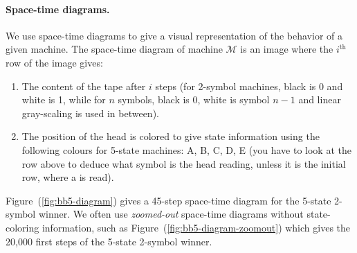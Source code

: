 


\paragraph*{Space-time diagrams.} We use space-time diagrams to give a visual representation of the behavior of a given machine. The space-time diagram of machine $\mathcal{M}$ is an image where the $i^\text{th}$ row of the image gives:
\begin{enumerate}
    \item The content of the tape after $i$ steps (for 2-symbol machines, black is 0 and white is 1, while for $n$ symbols, black is 0, white is symbol $n-1$ and linear gray-scaling is used in between).
    \item The position of the head is colored to give state information using the following colours for 5-state machines: \textcolor{colorA}{A},  \textcolor{colorB}{B},  \textcolor{colorC}{C},  \textcolor{colorD}{D},  \textcolor{colorE}{E} (you have to look at the row above to deduce what symbol is the head reading, unless it is the initial row, where a \szero is read).
\end{enumerate}

Figure~(\ref{fig:bb5-diagram}) gives a 45-step space-time diagram for the 5-state 2-symbol \BBfull winner. We often use \textit{zoomed-out} space-time diagrams without state-coloring information, such as Figure~(\ref{fig:bb5-diagram-zoomout}) which gives the 20,000 first steps of the 5-state 2-symbol \BBfull winner.


